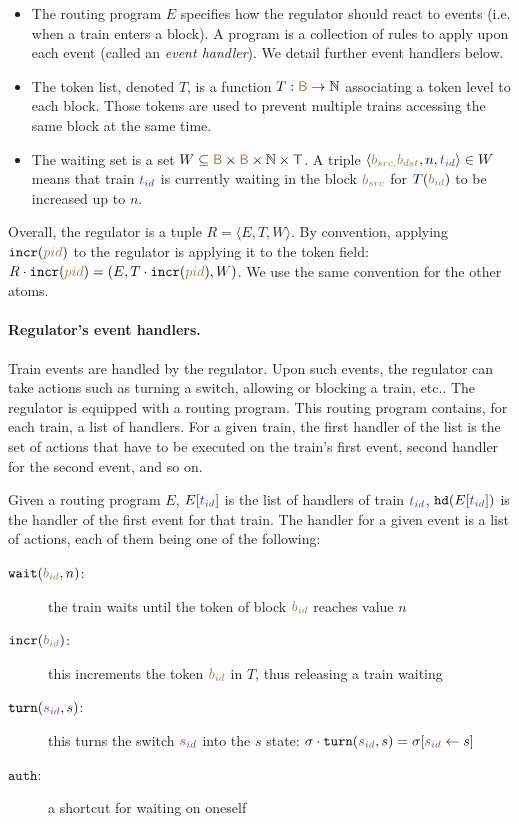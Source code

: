 \documentclass[runningheads]{llncs}
\newcommand{\Nat}{{\mbox{$\mathbb{N}$}}}
\newcommand{\tuple}[1]{\ensuremath{\langle #1\rangle}}
\newcommand{\posFmt}[1]{{\color{poscolor}{#1}}}
\newcommand{\blocks}{{\posFmt{\mathsf{B}}}}
\newcommand{\bid}[1]{\ensuremath{\posFmt{b_{#1}}}}
\newcommand{\swFmt}[1]{{\color{swcolor}{#1}}}
\newcommand{\sid}[1]{\ensuremath{\swFmt{s_{#1}}}}
\newcommand{\trainFmt}[1]{{\color{traincolor} #1}}
\newcommand{\trains}{{\trainFmt{\mathsf{T}}}}
\newcommand{\tid}[1]{\ensuremath{\trainFmt{t_{#1}}}}
\newcommand{\handlerOf}[2]{\ensuremath{#1[\trainFmt{#2}]}}
\newcommand{\regTuple}[3]{\tuple{#1, #2, #3}}
\newcommand{\incr}[1]{{\mbox{\ensuremath{\mathtt{incr}(\posFmt{#1})}}}\xspace}
\newcommand{\turn}[2]{{\mbox{\ensuremath{\mathtt{turn}(#1, #2)}}}\xspace}
\newcommand{\auth}{{\mbox{\ensuremath{\mathtt{auth}}}}\xspace}
\newcommand{\tokens}{\ensuremath{T}}
\newcommand{\tokenOf}[1]{\ensuremath{T(\posFmt{#1})}}
\newcommand{\wait}[2]{{\mbox{\ensuremath{\mathtt{wait}(\posFmt{#1}, #2)}}}\xspace}
\newcommand{\head}[1]{\ensuremath{{\tt hd}(#1)}}
\begin{document}
\begin{itemize}
	\item The routing program $E$ specifies how the regulator should react to events (i.e. when a train enters a block). A program is a collection of rules to apply upon each event (called an \emph{event handler}). We detail further event handlers below.
	\item The token list, denoted $\tokens$, is a function  $\tokens: \blocks \to \Nat$ associating a token level to each block. Those tokens are used to prevent multiple trains accessing the same block at the same time.
	\item The waiting set is a set $W \subseteq \blocks \times \blocks \times \Nat \times \trains$. A triple $\tuple{\bid{src, }\bid{dst}, n, \tid{id}} \in W$ means that train \tid{id} is currently waiting in the block \bid{src} for $\tokenOf{\bid{id}}$ to be increased up to $n$.
\end{itemize}

Overall, the regulator is a tuple $R = \regTuple{E}{\tokens}{W}$. By convention, applying $\incr{pid}$ to the regulator is applying it to the token field: $R \cdot \incr{pid} = (E, T \cdot \incr{pid}, W)$. We use the same convention for the other atoms. 

\paragraph{Regulator's event handlers.}

Train events are handled by the regulator. Upon such events, the regulator can take actions such as turning a switch, allowing or blocking a train, etc.. The regulator is equipped with a routing program. This routing program contains, for each train, a list of handlers. For a given train, the first handler of the list is the set of actions that have to be executed on the train's first event, second handler for the second event, and so on.

Given a routing program $E$, $\handlerOf{E}{\tid{id}}$ is the list of handlers of train $\tid{id}$, $\head{\handlerOf{E}{\tid{id}}}$ is the handler of the first event for that train.
The handler for a given event is a list of actions, each of them being one of the following:
\begin{description}
	\item [\wait{\bid{id}}{n}:] the train waits until the token of block \bid{id} reaches value $n$
	\item [\incr{\bid{id}}:] this increments the token $\bid{id}$ in $T$, thus releasing a train waiting
	\item [\turn{\sid{id}}{s}:] this turns the switch $\sid{id}$ into the $s$ state: $\sigma\cdot\turn{\sid{id}}{s} = \sigma[\sid{id} \leftarrow s]$
	\item [\auth:] a shortcut for waiting on oneself
\end{description}
\end{document}
